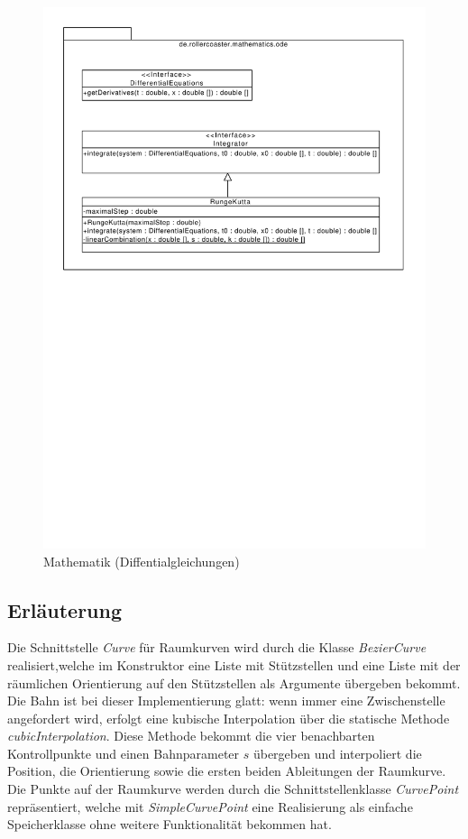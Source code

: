 \begin{figure}
\includegraphics[width=\linewidth]{bilder/Mathematics_ODE}
\caption{Mathematik (Diffentialgleichungen)}
\end{figure}

\subsection{Erläuterung}
Die Schnittstelle \emph{Curve} für Raumkurven wird durch die Klasse \emph{BezierCurve} 
realisiert,welche im Konstruktor eine Liste mit Stützstellen und eine Liste mit der
räumlichen Orientierung auf den Stützstellen als Argumente übergeben bekommt. Die Bahn
ist bei dieser Implementierung glatt: wenn immer eine Zwischenstelle angefordert wird,
erfolgt eine kubische Interpolation über die statische Methode \emph{cubicInterpolation}.
Diese Methode bekommt die vier benachbarten Kontrollpunkte und einen Bahnparameter $s$
übergeben und interpoliert die Position, die Orientierung sowie die ersten beiden 
Ableitungen der Raumkurve. 
Die Punkte auf der Raumkurve werden durch die Schnittstellenklasse \emph{CurvePoint}
repräsentiert, welche mit \emph{SimpleCurvePoint} eine Realisierung als einfache
Speicherklasse ohne weitere Funktionalität bekommen hat.


